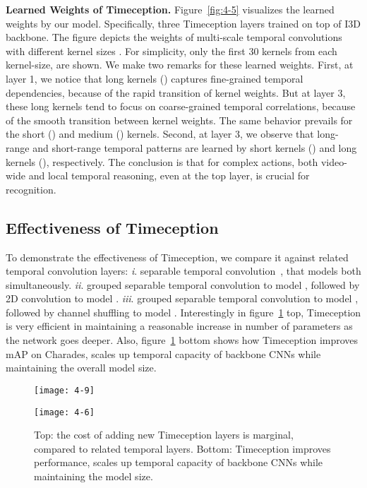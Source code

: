 \documentclass[10pt,twocolumn,letterpaper]{article}
\newcommand{\partitle}[1]{\noindent\textbf{#1}}
\newcommand{\ptspace}{\vspace*{5pt}}
\begin{document}
\ptspace
\partitle{Learned Weights of Timeception.}
Figure~\ref{fig:4-5} visualizes the learned weights by our model.
Specifically, three Timeception layers trained on top of I3D backbone.
The figure depicts the weights of multi-scale temporal convolutions with different kernel sizes .
For simplicity, only the first 30 kernels from each kernel-size, are shown.
We make two remarks for these learned weights.
First, at layer 1, we notice that long kernels () captures fine-grained temporal dependencies, because of the rapid transition of kernel weights.
But at layer 3, these long kernels tend to focus on coarse-grained temporal correlations, because of the smooth transition between kernel weights.
The same behavior prevails for the short () and medium () kernels.
Second, at layer 3, we observe that long-range and short-range temporal patterns are learned by short kernels () and long kernels (), respectively.
The conclusion is that for complex actions, both video-wide and local temporal reasoning, even at the top layer, is crucial for recognition.

\subsection{Effectiveness of Timeception}
To demonstrate the effectiveness of Timeception, we compare it against related temporal convolution layers:
\textit{i}. separable temporal convolution~\cite{tran2018closer}, that models both  simultaneously.
\textit{ii}. grouped separable temporal convolution to model , followed by  2D convolution to model .
\textit{iii}. grouped separable temporal convolution to model , followed by channel shuffling to model .
Interestingly in figure~\ref{fig:4-9} top, Timeception is very efficient in maintaining a reasonable increase in number of parameters as the network goes deeper.
Also, figure~\ref{fig:4-9} bottom shows how Timeception improves mAP on Charades, scales up temporal capacity of backbone CNNs while maintaining the overall model size.

\begin{figure}[ht]
\begin{center}
\texttt{[image: 4-9]}
\end{center}
\vspace*{-10mm}
\end{figure}

\begin{figure}[ht]
\begin{center}
\texttt{[image: 4-6]}
\end{center}
\caption{
Top: the cost of adding new Timeception layers is marginal, compared to related temporal layers.
Bottom: Timeception improves performance, scales up temporal capacity of backbone CNNs while maintaining the model size.}
\label{fig:4-9}
\vspace*{-5mm}
\end{figure}
\end{document}
